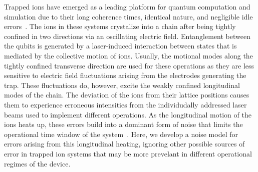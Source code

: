 \documentclass[prx,aps,twocolumn,showpacs,superscriptaddress,10pt]{revtex4-1}
\begin{document}
Trapped ions have emerged as a leading platform for quantum computation and simulation due to their long coherence times, identical nature, and negligible idle errors~\cite{Ladd2010, Cetina2020}. The ions in these systems crystalize into a chain after being tightly confined in two directions via an oscillating electric field. Entanglement between the  qubits is generated by a laser-induced interaction between states that is mediated by the collective motion of ions. Usually, the motional modes along the tightly confined transverse direction are used for these operations as they are less sensitive to electric field fluctuations arising from the electrodes generating the trap. These fluctuations do, however, excite the weakly confined longitudinal modes of the chain. The deviation of the ions from their lattice positions causes them to experience erroneous intensities from the individudally addressed laser beams used to implement different operations. As the longitudinal motion of the ions heats up, these errors build into a dominant form of noise that limits the operational time window of the system~\cite{Cetina2020}. Here, we develop a noise model for errors arising from this longitudinal heating, ignoring other possible sources of error in trapped ion systems that may be more prevelant in different operational regimes of the device.
\end{document}
